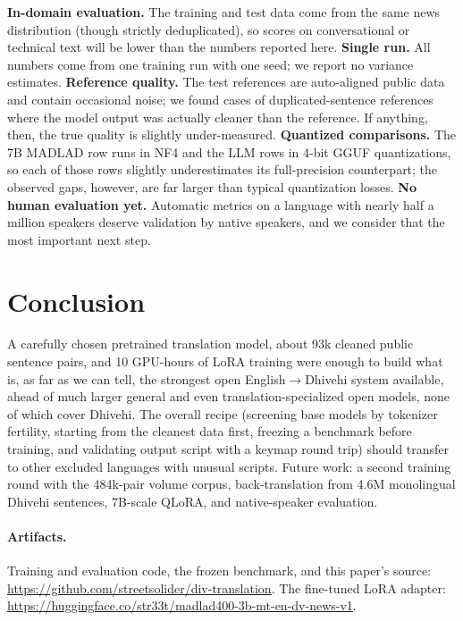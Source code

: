 \documentclass[10pt,twocolumn]{article}
\begin{document}
\textbf{In-domain evaluation.} The training and test data come from the
same news distribution (though strictly deduplicated), so scores on
conversational or technical text will be lower than the numbers reported
here. \textbf{Single run.} All numbers come from one training run with one
seed; we report no variance estimates. \textbf{Reference quality.} The test
references are auto-aligned public data and contain occasional noise; we
found cases of duplicated-sentence references where the model output was
actually cleaner than the reference. If anything, then, the true quality
is slightly under-measured. \textbf{Quantized comparisons.} The 7B MADLAD
row runs in NF4 and the LLM rows in 4-bit GGUF quantizations, so each of
those rows slightly underestimates its full-precision counterpart; the
observed gaps, however, are far larger than typical quantization losses.
\textbf{No human evaluation yet.} Automatic metrics on a language with
nearly half a million speakers deserve validation by native speakers, and
we consider that the most important next step.

\section{Conclusion}

A carefully chosen pretrained translation model, about 93k cleaned public
sentence pairs, and 10 GPU-hours of LoRA training were enough to build
what is, as far as we can tell, the strongest open English$\to$Dhivehi
system available, ahead of much larger general and even
translation-specialized open models, none of which cover Dhivehi. The
overall recipe (screening base models by tokenizer fertility, starting
from the cleanest data first, freezing a benchmark before training, and
validating output script with a keymap round trip) should transfer to
other excluded languages with unusual scripts. Future work: a second
training round with the 484k-pair volume corpus, back-translation from
4.6M monolingual Dhivehi sentences, 7B-scale QLoRA, and native-speaker
evaluation.

\paragraph{Artifacts.}
Training and evaluation code, the frozen benchmark, and this paper's
source: \url{https://github.com/streetsolider/div-translation}. The
fine-tuned LoRA adapter:
\url{https://huggingface.co/str33t/madlad400-3b-mt-en-dv-news-v1}.
\end{document}
